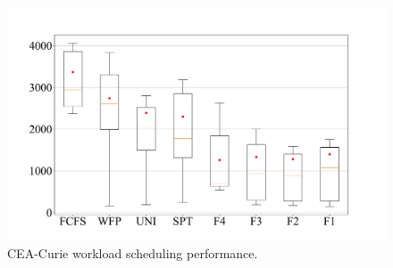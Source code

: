\documentclass[a4paper,fleqn]{cas-sc}
\begin{document}
\begin{figure}[htbp]
{\begin{minipage}[t]{0.44\linewidth}
			\includegraphics[scale=.20]{figs/Fig7c.pdf}
		\end{minipage}
	}%
	
	\centering
	\caption{CEA-Curie workload scheduling performance.} \label{Fig:7}
\end{figure}
\end{document}
